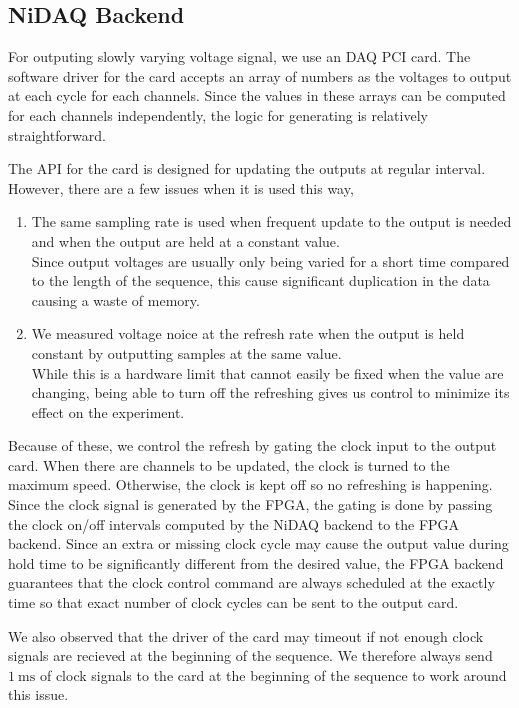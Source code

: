 \subsection{NiDAQ Backend}
\label{ch:computer-control:backend:nidaq}
For outputing slowly varying voltage signal, we use an DAQ PCI card.
The software driver for the card accepts an array of numbers as the voltages
to output at each cycle for each channels.
Since the values in these arrays can be computed for each channels independently,
the logic for generating is relatively straightforward.

The API for the card is designed for updating the outputs at regular interval.
However, there are a few issues when it is used this way,
\begin{enumerate}
\item The same sampling rate is used when frequent update to the output is needed
  and when the output are held at a constant value.\\
  Since output voltages are usually only being varied for a short time compared
  to the length of the sequence,
  this cause significant duplication in the data causing a waste of memory.
\item We measured voltage noice at the refresh rate when the output is held constant
  by outputting samples at the same value.\\
  While this is a hardware limit that cannot easily be fixed when the value are changing,
  being able to turn off the refreshing gives us control to minimize its effect
  on the experiment.
\end{enumerate}
Because of these, we control the refresh by gating the clock input to the output card.
When there are channels to be updated, the clock is turned to the maximum speed.
Otherwise, the clock is kept off so no refreshing is happening.
Since the clock signal is generated by the FPGA, the gating is done
by passing the clock on/off intervals computed by the NiDAQ backend to the FPGA backend.
Since an extra or missing clock cycle may cause the output value during hold time
to be significantly different from the desired value,
the FPGA backend guarantees that the clock control command are always scheduled
at the exactly time so that exact number of clock cycles can be sent to the output card.

We also observed that the driver of the card may timeout if not enough clock signals are recieved
at the beginning of the sequence. We therefore always send $1~\mathrm{ms}$
of clock signals to the card at the beginning of the sequence to work around this issue.

